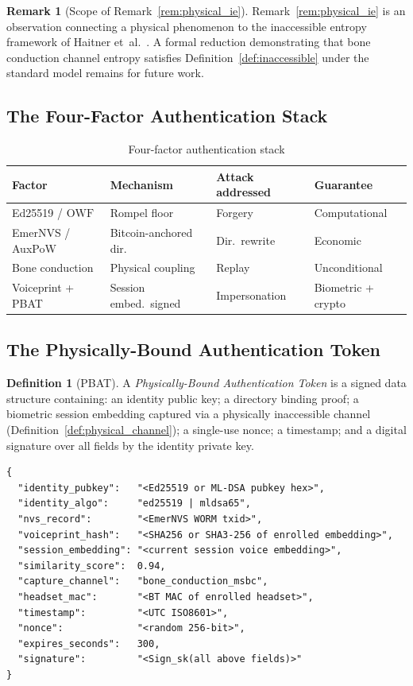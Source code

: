 \documentclass[11pt,a4paper]{article}
\theoremstyle{definition}
\newtheorem{definition}[theorem]{Definition}
\newtheorem{remark}[theorem]{Remark}
\newcommand{\OWF}{\mathrm{OWF}}
\newcommand{\PBAT}{\textsf{PBAT}}
\begin{document}
\begin{remark}[Scope of Remark~\ref{rem:physical_ie}]
Remark~\ref{rem:physical_ie} is an observation connecting a physical
phenomenon to the inaccessible entropy framework of Haitner
et~al.~\cite{Haitner10}. A formal reduction demonstrating that bone
conduction channel entropy satisfies Definition~\ref{def:inaccessible}
under the standard model remains for future work.
\end{remark}

\subsection{The Four-Factor Authentication Stack}

\begin{table}[h]
\centering
\caption{Four-factor authentication stack}
\label{tab:fourfactor}
\begin{tabular}{llll}
\toprule
Factor & Mechanism & Attack addressed & Guarantee \\
\midrule
Ed25519 / $\OWF$ & Rompel floor & Forgery & Computational \\
EmerNVS / AuxPoW & Bitcoin-anchored dir. & Dir.\ rewrite & Economic \\
Bone conduction & Physical coupling & Replay & Unconditional \\
Voiceprint + \PBAT{} & Session embed.\ signed & Impersonation &
Biometric + crypto \\
\bottomrule
\end{tabular}
\end{table}

\subsection{The Physically-Bound Authentication Token}

\begin{definition}[\PBAT{}]
\label{def:pbat}
A \emph{Physically-Bound Authentication Token} is a signed data
structure containing: an identity public key; a directory binding
proof; a biometric session embedding captured via a physically
inaccessible channel (Definition~\ref{def:physical_channel}); a
single-use nonce; a timestamp; and a digital signature over all
fields by the identity private key.
\end{definition}

\begin{lstlisting}
{
  "identity_pubkey":   "<Ed25519 or ML-DSA pubkey hex>",
  "identity_algo":     "ed25519 | mldsa65",
  "nvs_record":        "<EmerNVS WORM txid>",
  "voiceprint_hash":   "<SHA256 or SHA3-256 of enrolled embedding>",
  "session_embedding": "<current session voice embedding>",
  "similarity_score":  0.94,
  "capture_channel":   "bone_conduction_msbc",
  "headset_mac":       "<BT MAC of enrolled headset>",
  "timestamp":         "<UTC ISO8601>",
  "nonce":             "<random 256-bit>",
  "expires_seconds":   300,
  "signature":         "<Sign_sk(all above fields)>"
}
\end{lstlisting}
\end{document}
